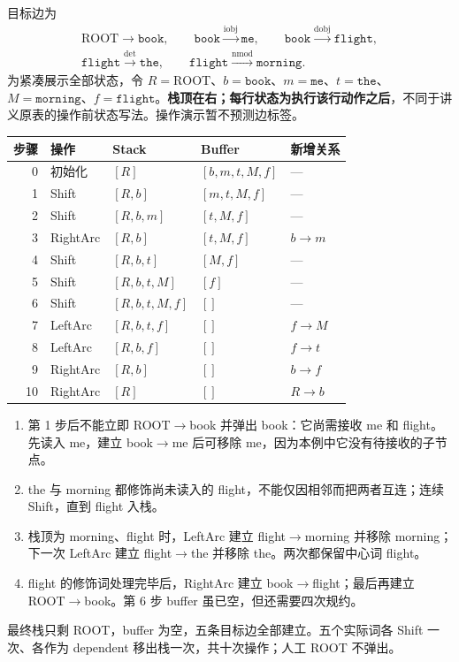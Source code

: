 \begin{workedsolution}
目标边为
\[
\begin{gathered}
\mathrm{ROOT}\rightarrow\texttt{book},\qquad
\texttt{book}\xrightarrow{\mathrm{iobj}}\texttt{me},\qquad
\texttt{book}\xrightarrow{\mathrm{dobj}}\texttt{flight},\\
\texttt{flight}\xrightarrow{\mathrm{det}}\texttt{the},\qquad
\texttt{flight}\xrightarrow{\mathrm{nmod}}\texttt{morning}.
\end{gathered}
\]
为紧凑展示全部状态，令 $R=\mathrm{ROOT}$、$b=\texttt{book}$、$m=\texttt{me}$、$t=\texttt{the}$、$M=\texttt{morning}$、$f=\texttt{flight}$。\textbf{栈顶在右；每行状态为执行该行动作之后}，不同于讲义原表的操作前状态写法。操作演示暂不预测边标签。

\begin{center}
\small
\begin{tabular}{@{}r l l l l@{}}
\toprule
步骤 & 操作 & Stack & Buffer & 新增关系 \\
\midrule
0 & 初始化 & $[R]$ & $[b,m,t,M,f]$ & --- \\
1 & Shift & $[R,b]$ & $[m,t,M,f]$ & --- \\
2 & Shift & $[R,b,m]$ & $[t,M,f]$ & --- \\
3 & RightArc & $[R,b]$ & $[t,M,f]$ & $b\rightarrow m$ \\
4 & Shift & $[R,b,t]$ & $[M,f]$ & --- \\
5 & Shift & $[R,b,t,M]$ & $[f]$ & --- \\
6 & Shift & $[R,b,t,M,f]$ & $[]$ & --- \\
7 & LeftArc & $[R,b,t,f]$ & $[]$ & $f\rightarrow M$ \\
8 & LeftArc & $[R,b,f]$ & $[]$ & $f\rightarrow t$ \\
9 & RightArc & $[R,b]$ & $[]$ & $b\rightarrow f$ \\
10 & RightArc & $[R]$ & $[]$ & $R\rightarrow b$ \\
\bottomrule
\end{tabular}
\end{center}

\begin{enumerate}
  \item 第 1 步后不能立即 ROOT$\rightarrow$book 并弹出 book：它尚需接收 me 和 flight。先读入 me，建立 book$\rightarrow$me 后可移除 me，因为本例中它没有待接收的子节点。
  \item the 与 morning 都修饰尚未读入的 flight，不能仅因相邻而把两者互连；连续 Shift，直到 flight 入栈。
  \item 栈顶为 morning、flight 时，LeftArc 建立 flight$\rightarrow$morning 并移除 morning；下一次 LeftArc 建立 flight$\rightarrow$the 并移除 the。两次都保留中心词 flight。
  \item flight 的修饰词处理完毕后，RightArc 建立 book$\rightarrow$flight；最后再建立 ROOT$\rightarrow$book。第 6 步 buffer 虽已空，但还需要四次规约。
\end{enumerate}
最终栈只剩 ROOT，buffer 为空，五条目标边全部建立。五个实际词各 Shift 一次、各作为 dependent 移出栈一次，共十次操作；人工 ROOT 不弹出。
\end{workedsolution}

